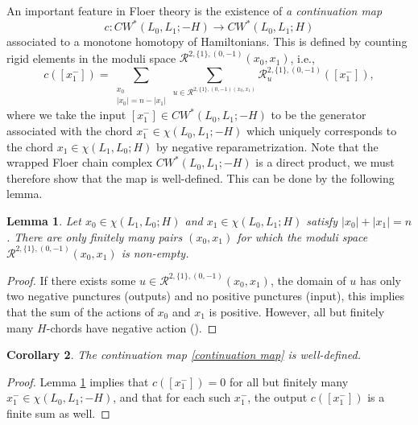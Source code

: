 \documentclass[11pt]{amsproc}
\def\cR{\mathcal{R}}
\newtheorem{lem}{Lemma}[section]
\newtheorem{cor}[lem]{Corollary}
\theoremstyle{remark}
\numberwithin{equation}{section}
\begin{document}
An important feature in Floer theory is the existence of {\it a continuation map}
\begin{equation}\label{continuation map}
c: CW^{*}(L_{0}, L_{1}; -H) \to CW^{*}(L_{0}, L_{1}; H)
\end{equation}
associated to a monotone homotopy of Hamiltonians.
This is defined by counting rigid elements in the moduli space $\cR^{2, \{1\}, (0, -1)}(x_{0}, x_{1})$, i.e.,
\begin{equation}\label{continuation map formula}
c([x_{1}^{-}]) = \sum_{\substack{x_{0}\\|x_{0}| = n - |x_{1}|}} \sum_{u \in \cR^{2, \{1\}, (0, -1)(x_{0}, x_{1})}} \cR^{2, \{1\}, (0, -1)}_{u}([x_{1}^{-}]),
\end{equation}
where we take the input $[x_{1}^{-}] \in CW^{*}(L_{0}, L_{1}; -H)$ to be the generator associated with the chord $x_{1}^{-} \in \chi(L_{0}, L_{1}; -H)$ which uniquely corresponds to the chord $x_{1} \in \chi(L_{1}, L_{0}; H)$ by negative reparametrization.
Note that the wrapped Floer chain complex $CW^{*}(L_{0}, L_{1}; -H)$ is a direct product, 
we must therefore show that the map is well-defined.
This can be done by the following lemma.

\begin{lem}\label{lem: finitely many continuation moduli spaces}
Let $x_{0} \in \chi(L_{1}, L_{0}; H)$ and $x_{1} \in \chi(L_{0}, L_{1}; H)$ satisfy $|x_{0}|+|x_{1}|=n$. 
There are only finitely many pairs $(x_{0}, x_{1})$ for which the moduli space $\cR^{2, \{1\}, (0, -1)}(x_{0}, x_{1})$ is non-empty.
\end{lem}
\begin{proof}
If there exists some $u \in \cR^{2, \{1\}, (0, -1)}(x_{0}, x_{1})$,
the domain of $u$ has only two negative punctures (outputs) and no positive punctures (input),
this implies that the sum of the actions of $x_{0}$ and $x_{1}$ is positive.
However, all but finitely many $H$-chords have negative action (\cite[Lemma B.2]{abouzaid_gc}).
\end{proof}

\begin{cor}\label{cor: continuation map well-defined}
The continuation map \eqref{continuation map} is well-defined.
\end{cor}
\begin{proof}
Lemma \ref{lem: finitely many continuation moduli spaces} implies that $c([x_{1}^{-}]) = 0$ for all but finitely many $x_{1}^{-} \in \chi(L_{0}, L_{1}; -H)$,
and that for each such $x_{1}^{-}$, the output $c([x_{1}^{-}])$ is a finite sum as well.
\end{proof}
\end{document}

